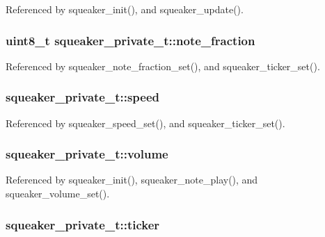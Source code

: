 Referenced by squeaker\_\-init(), and squeaker\_\-update().\hypertarget{structsqueaker__private__t_315fb902ec138569cbb35195ae7c06a9}{
\subsubsection{\setlength{\rightskip}{0pt plus 5cm}uint8\_\-t {\bf squeaker\_\-private\_\-t::note\_\-fraction}}}
\label{structsqueaker__private__t_315fb902ec138569cbb35195ae7c06a9}




Referenced by squeaker\_\-note\_\-fraction\_\-set(), and squeaker\_\-ticker\_\-set().\hypertarget{structsqueaker__private__t_8cb834a7e4b7213d6510f8d341e4043e}{
\subsubsection{ {\bf squeaker\_\-private\_\-t::speed}}}
\label{structsqueaker__private__t_8cb834a7e4b7213d6510f8d341e4043e}




Referenced by squeaker\_\-speed\_\-set(), and squeaker\_\-ticker\_\-set().\hypertarget{structsqueaker__private__t_aa144fd704f02c394c6c9dbd4e77f009}{
\subsubsection{ {\bf squeaker\_\-private\_\-t::volume}}}
\label{structsqueaker__private__t_aa144fd704f02c394c6c9dbd4e77f009}




Referenced by squeaker\_\-init(), squeaker\_\-note\_\-play(), and squeaker\_\-volume\_\-set().\hypertarget{structsqueaker__private__t_e56e5ae9f7afd550010187b2e11cb061}{
\subsubsection{ {\bf squeaker\_\-private\_\-t::ticker}}}
\label{structsqueaker__private__t_e56e5ae9f7afd550010187b2e11cb061}





